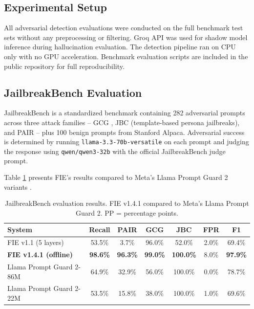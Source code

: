 \documentclass[preprint,12pt,authoryear]{elsarticle}
\begin{document}
\subsection{Experimental Setup}

All adversarial detection evaluations were conducted on the full
benchmark test sets without any preprocessing or filtering. Groq API
was used for shadow model inference during hallucination evaluation.
The detection pipeline ran on CPU only with no GPU acceleration.
Benchmark evaluation scripts are included in the public repository
for full reproducibility.

\subsection{JailbreakBench Evaluation}

JailbreakBench \citep{chao2024jailbreakbench} is a standardized
benchmark containing 282 adversarial prompts across three attack
families -- GCG \citep{zou2023universal}, JBC (template-based persona
jailbreaks), and PAIR \citep{chao2023jailbreaking} -- plus 100 benign
prompts from Stanford Alpaca. Adversarial success is determined by
running \texttt{llama-3.3-70b-versatile} on each prompt and judging
the response using \texttt{qwen/qwen3-32b} with the official
JailbreakBench judge prompt.

Table \ref{tab:jbb} presents FIE's results compared to Meta's Llama
Prompt Guard 2 variants \citep{metallamaguard2024}.

\begin{table}[H]
\centering
\caption{JailbreakBench evaluation results. FIE v1.4.1 compared to
Meta's Llama Prompt Guard 2. PP = percentage points.}
\label{tab:jbb}
\begin{tabular}{lcccccc}
\toprule
\textbf{System} & \textbf{Recall} & \textbf{PAIR} & \textbf{GCG}
  & \textbf{JBC} & \textbf{FPR} & \textbf{F1} \\
\midrule
FIE v1.1 (5 layers) & 53.5\% & 3.7\% & 96.0\% & 52.0\% & 2.0\% & 69.4\% \\
\textbf{FIE v1.4.1 (offline)} & \textbf{98.6\%} & \textbf{96.3\%}
  & \textbf{99.0\%} & \textbf{100.0\%} & 8.0\% & \textbf{97.9\%} \\
Llama Prompt Guard 2-86M & 64.9\% & 32.9\% & 56.0\% & 100.0\%
  & 0.0\% & 78.7\% \\
Llama Prompt Guard 2-22M & 53.5\% & 15.8\% & 38.0\% & 100.0\%
  & 1.0\% & 69.6\% \\
\bottomrule
\end{tabular}
\end{table}
\end{document}

